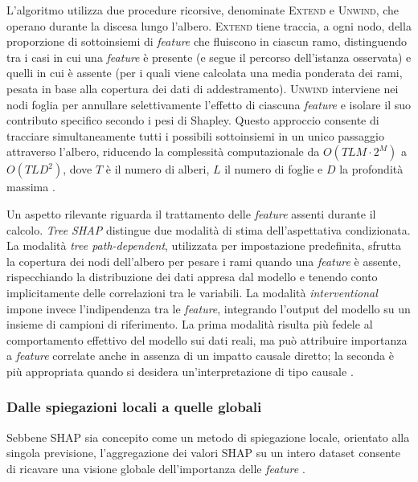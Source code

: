 L'algoritmo utilizza due procedure ricorsive, denominate \textsc{Extend} e \textsc{Unwind}, che operano durante la discesa lungo l'albero. \textsc{Extend} tiene traccia, a ogni nodo, della proporzione di sottoinsiemi di \textit{feature} che fluiscono in ciascun ramo, distinguendo tra i casi in cui una \textit{feature} è presente (e segue il percorso dell'istanza osservata) e quelli in cui è assente (per i quali viene calcolata una media ponderata dei rami, pesata in base alla copertura dei dati di addestramento). \textsc{Unwind} interviene nei nodi foglia per annullare selettivamente l'effetto di ciascuna \textit{feature} e isolare il suo contributo specifico secondo i pesi di Shapley. Questo approccio consente di tracciare simultaneamente tutti i possibili sottoinsiemi in un unico passaggio attraverso l'albero, riducendo la complessità computazionale da $O(TLM \cdot 2^M)$ a $O(TLD^2)$, dove $T$ è il numero di alberi, $L$ il numero di foglie e $D$ la profondità massima \cite{lundberg2019explainable}.

Un aspetto rilevante riguarda il trattamento delle \textit{feature} assenti durante il calcolo. \textit{Tree SHAP} distingue due modalità di stima dell'aspettativa condizionata. La modalità \textit{tree path-dependent}, utilizzata per impostazione predefinita, sfrutta la copertura dei nodi dell'albero per pesare i rami quando una \textit{feature} è assente, rispecchiando la distribuzione dei dati appresa dal modello e tenendo conto implicitamente delle correlazioni tra le variabili. La modalità \textit{interventional} impone invece l'indipendenza tra le \textit{feature}, integrando l'output del modello su un insieme di campioni di riferimento. La prima modalità risulta più fedele al comportamento effettivo del modello sui dati reali, ma può attribuire importanza a \textit{feature} correlate anche in assenza di un impatto causale diretto; la seconda è più appropriata quando si desidera un'interpretazione di tipo causale \cite{lundberg2019explainable}.

\subsubsection{Dalle spiegazioni locali a quelle globali}

Sebbene SHAP sia concepito come un metodo di spiegazione locale, orientato alla singola previsione, l'aggregazione dei valori SHAP su un intero dataset consente di ricavare una visione globale dell'importanza delle \textit{feature} \cite{lundberg2019explainable}.

